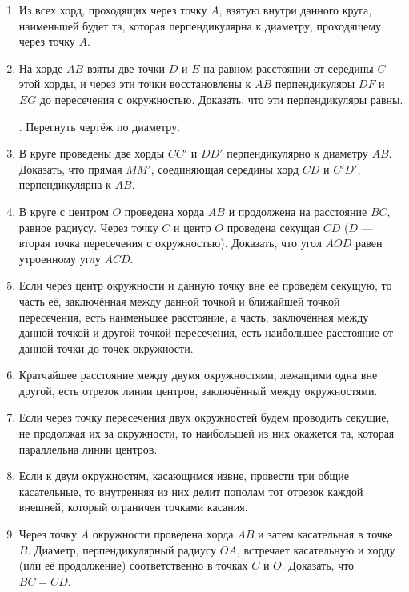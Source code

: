 \documentclass[oneside]{book}
\begin{document}
\begin{enumerate}[resume]


 \item
Из всех хорд, проходящих через точку $A$, взятую внутри данного круга, наименьшей будет та, которая перпендикулярна к диаметру, проходящему через точку $A$.

 \item
На хорде $AB$ взяты две точки $D$ и $E$ на равном расстоянии от середины $C$ этой хорды, и через эти точки восстановлены к $AB$ перпендикуляры $DF$ и $EG$ до пересечения с окружностью.
Доказать, что эти перпендикуляры равны.

.
Перегнуть чертёж по диаметру.

 \item
В круге проведены две хорды $CC'$ и $DD'$ перпендикулярно к диаметру $AB$.
Доказать, что прямая $MM'$, соединяющая середины хорд $CD$ и $C'D'$, перпендикулярна к $AB$.

 \item
В круге с центром $O$ проведена хорда $AB$ и продолжена на расстояние $BC$, равное радиусу.
Через точку $C$ и центр $O$ проведена секущая $CD$ ($D$ — вторая точка пересечения с окружностью).
Доказать, что угол $AOD$ равен утроенному углу $ACD$.

 \item
Если через центр окружности и данную точку вне её проведём секущую, то часть её, заключённая между данной точкой и ближайшей точкой пересечения, есть наименьшее расстояние, а часть, заключённая между данной точкой и другой точкой пересечения, есть наибольшее расстояние от данной точки до точек окружности.

 \item
Кратчайшее расстояние между двумя окружностями, лежащими одна вне другой, есть отрезок линии центров, заключённый между окружностями.

 \item
Если через точку пересечения двух окружностей будем проводить секущие, не продолжая их за окружности, то наибольшей из них окажется та, которая параллельна линии центров.

 \item
Если к двум окружностям, касающимся извне, провести три общие касательные, то внутренняя из них делит пополам тот отрезок каждой внешней, который ограничен точками касания.

 \item
Через точку $A$ окружности проведена хорда $AB$ и затем касательная в точке $B$.
Диаметр, перпендикулярный радиусу $OA$, встречает касательную и хорду (или её продолжение) соответственно в точках $C$ и $O$.
Доказать, что $BC=CD$.


\end{enumerate}
\end{document}
